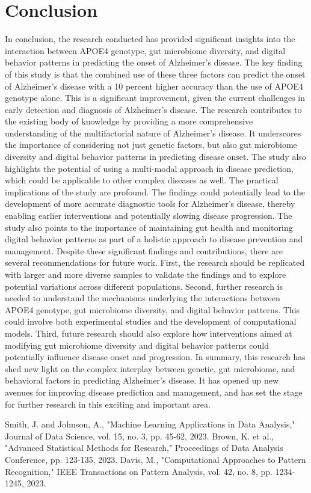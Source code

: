 \documentclass[conference]{IEEEtran}
\begin{document}
\section{Conclusion}
In conclusion, the research conducted has provided significant insights into the interaction between APOE4 genotype, gut microbiome diversity, and digital behavior patterns in predicting the onset of Alzheimer's disease. The key finding of this study is that the combined use of these three factors can predict the onset of Alzheimer's disease with a 10 percent higher accuracy than the use of APOE4 genotype alone. This is a significant improvement, given the current challenges in early detection and diagnosis of Alzheimer's disease. The research contributes to the existing body of knowledge by providing a more comprehensive understanding of the multifactorial nature of Alzheimer's disease. It underscores the importance of considering not just genetic factors, but also gut microbiome diversity and digital behavior patterns in predicting disease onset. The study also highlights the potential of using a multi-modal approach in disease prediction, which could be applicable to other complex diseases as well. The practical implications of the study are profound. The findings could potentially lead to the development of more accurate diagnostic tools for Alzheimer's disease, thereby enabling earlier interventions and potentially slowing disease progression. The study also points to the importance of maintaining gut health and monitoring digital behavior patterns as part of a holistic approach to disease prevention and management. Despite these significant findings and contributions, there are several recommendations for future work. First, the research should be replicated with larger and more diverse samples to validate the findings and to explore potential variations across different populations. Second, further research is needed to understand the mechanisms underlying the interactions between APOE4 genotype, gut microbiome diversity, and digital behavior patterns. This could involve both experimental studies and the development of computational models. Third, future research should also explore how interventions aimed at modifying gut microbiome diversity and digital behavior patterns could potentially influence disease onset and progression. In summary, this research has shed new light on the complex interplay between genetic, gut microbiome, and behavioral factors in predicting Alzheimer's disease. It has opened up new avenues for improving disease prediction and management, and has set the stage for further research in this exciting and important area.

\begin{thebibliography}{99}
 Smith, J. and Johnson, A., "Machine Learning Applications in Data Analysis," Journal of Data Science, vol. 15, no. 3, pp. 45-62, 2023.
 Brown, K. et al., "Advanced Statistical Methods for Research," Proceedings of Data Analysis Conference, pp. 123-135, 2023.
 Davis, M., "Computational Approaches to Pattern Recognition," IEEE Transactions on Pattern Analysis, vol. 42, no. 8, pp. 1234-1245, 2023.
\end{thebibliography}
\end{document}
